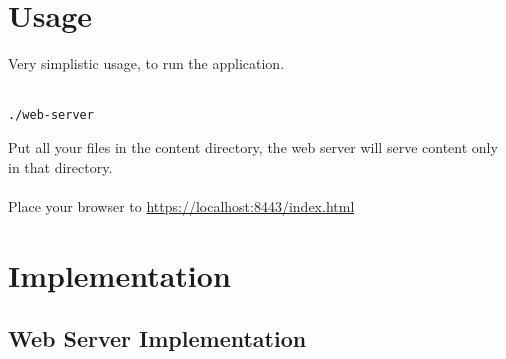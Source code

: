\documentclass[a4paper,12pt]{article}
\begin{document}
\section{Usage}
Very simplistic usage, to run the application.\\
\\
\begin{lstlisting}
./web-server
\end{lstlisting}

Put all your files in the content directory, the web server
will serve content only in that directory.\\
\\
Place your browser to \url{https://localhost:8443/index.html}

\section{Implementation}
\subsection{Web Server Implementation}
\end{document}
